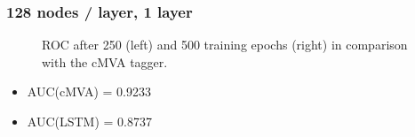\documentclass{beamer}
\begin{document}
\begin{frame}
  \frametitle{128 nodes / layer, 1 layer}

  \begin{figure}[htb]
    \centering

    \caption{ROC after 250 (left) and 500 training epochs (right) in comparison with the cMVA tagger.}
  \end{figure}

  \begin{itemize}
  \item AUC(cMVA) = 0.9233
  \item AUC(LSTM) = 0.8737
  \end{itemize}

\end{frame}
\end{document}
